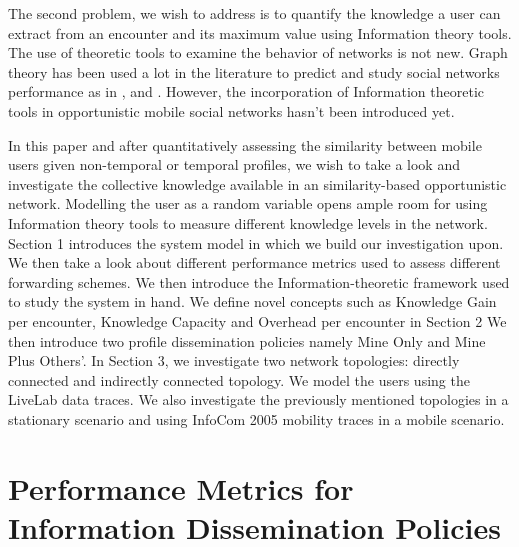 \documentclass[11pt]{article}
\begin{document}
 
The second problem, we wish to address is to quantify the knowledge a user can extract from an encounter and its maximum value using Information theory tools. The use of theoretic tools to examine the behavior of networks is not new. Graph theory has been used a lot in the literature to predict and study social networks performance as in \cite{graph1}, \cite{graph2} and \cite{graph3}. However, the incorporation of Information theoretic tools in opportunistic mobile social networks hasn't been introduced yet.

In this paper and after quantitatively assessing the similarity between mobile users given non-temporal or temporal profiles, we wish to take a look and investigate the collective knowledge available in an similarity-based opportunistic network. Modelling the user as a random variable opens ample room for using Information theory tools to measure different knowledge levels in the network. Section 1 introduces the system model in which we build our investigation upon. We then take a look about different performance metrics used to assess different forwarding schemes. We then introduce the Information-theoretic framework used to study the system in hand. We define novel concepts such as Knowledge Gain per encounter, Knowledge Capacity and Overhead per encounter in Section 2 We then introduce two profile dissemination policies namely Mine Only and Mine Plus Others'. In Section 3, we investigate two network topologies: directly connected and indirectly connected topology. We model the users using the LiveLab \cite{data} data traces. We also investigate the previously mentioned topologies in a stationary scenario and using InfoCom 2005 \cite{infocom} mobility traces in a mobile scenario.

\section{Performance Metrics for Information Dissemination Policies}
\end{document}
